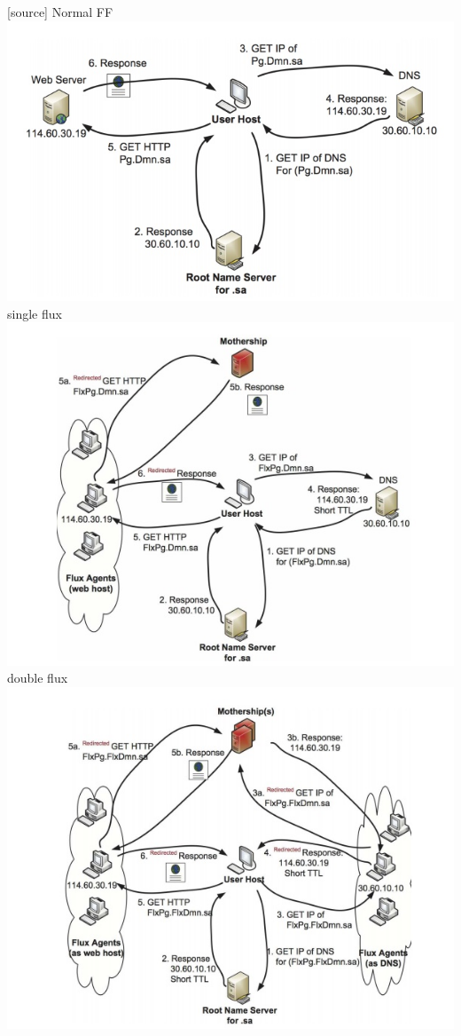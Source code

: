 [source]
Normal FF\\
\includegraphics[scale=.7]{img/normal_FF.jpg}
single flux\\
\includegraphics[scale=.7]{img/single_FF.jpg}
double flux\\
\includegraphics[scale=.7]{img/double_FF.jpg}

